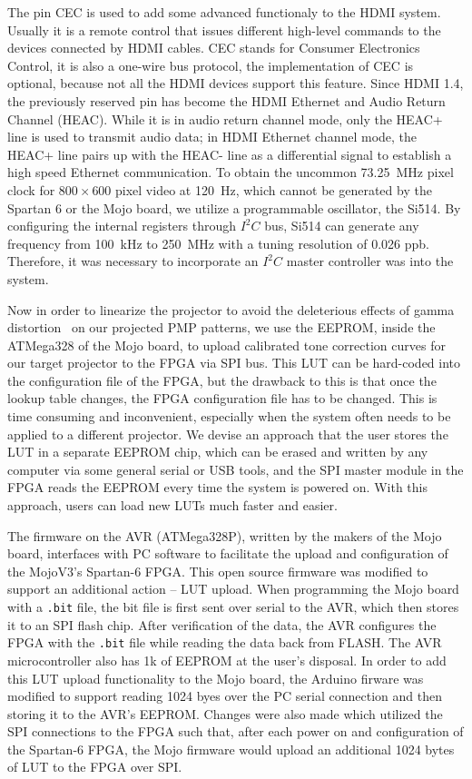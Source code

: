 \documentclass[]{spie}  %
\begin{document}
The pin CEC is used to add some advanced functionaly to the HDMI system. Usually it is a remote control that issues different high-level commands to the devices connected by HDMI cables. CEC stands for Consumer Electronics Control, it is also a one-wire bus protocol, the implementation of CEC is optional, because not all the HDMI devices support this feature. Since HDMI 1.4, the previously reserved pin has become the HDMI Ethernet and Audio Return Channel (HEAC). While it is in audio return channel mode, only the HEAC+ line is used to transmit audio data; in HDMI Ethernet channel mode, the HEAC+ line pairs up with the HEAC- line as a differential signal to establish a high speed Ethernet communication. To obtain the uncommon 73.25~MHz pixel clock for $800\times 600$ pixel video at 120~Hz, which cannot be generated by the Spartan 6 or the Mojo board, we utilize a programmable oscillator, the Si514. By configuring the internal registers through $I^2C$ bus, Si514 can generate any frequency from 100~kHz to 250~MHz with a tuning resolution of 0.026 ppb. Therefore, it was necessary to incorporate an $I^2C$ master controller was into the system.%

Now in order to linearize the projector to avoid the deleterious effects of gamma distortion~\cite{gamm10} on our projected PMP patterns, we use the EEPROM, inside the ATMega328 of the Mojo board, to upload calibrated tone correction curves for our target projector to the FPGA via SPI bus. This LUT can be hard-coded into the configuration file of the FPGA, but the drawback to this is that once the lookup table changes, the FPGA configuration file has to be changed. This is time consuming and inconvenient, especially when the system often needs to be applied to a different projector. We devise an approach that the user stores the LUT in a separate EEPROM chip, which can be erased and written by any computer via some general serial or USB tools, and the SPI master module in the FPGA reads the EEPROM every time the system is powered on. With this approach, users can load new LUTs much faster and easier.

The  firmware on the AVR (ATMega328P), written by the makers of the Mojo board, interfaces with PC software to facilitate the upload and configuration of the MojoV3's Spartan-6 FPGA. This open source firmware was modified to support an additional action -- LUT upload. When programming the Mojo board with a \texttt{.bit} file, the bit file is first sent over serial to the AVR, which then stores it to an SPI flash chip. After verification of the data, the AVR  configures the FPGA with the \texttt{.bit} file while reading the data back from FLASH. The AVR microcontroller also has 1k of EEPROM at the user's disposal. In order to add this LUT upload functionality to the Mojo board, the Arduino firware was modified to support reading 1024 byes over the PC serial connection and then storing it to the AVR's EEPROM. Changes were also made which utilized the SPI connections to the FPGA such that, after each power on and configuration of the Spartan-6 FPGA, the Mojo firmware would upload an additional 1024 bytes of LUT to the FPGA over SPI.
\end{document}
